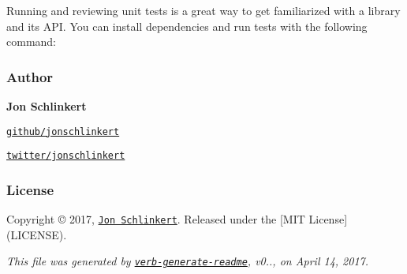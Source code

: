 Running and reviewing unit tests is a great way to get familiarized with a library and its A\+PI. You can install dependencies and run tests with the following command\+:




\subsubsection*{Author}

{\bfseries Jon Schlinkert}


\begin{DoxyItemize}
\item \href{https://github.com/jonschlinkert}{\tt github/jonschlinkert}
\item \href{https://twitter.com/jonschlinkert}{\tt twitter/jonschlinkert}
\end{DoxyItemize}

\subsubsection*{License}

Copyright © 2017, \href{https://github.com/jonschlinkert}{\tt Jon Schlinkert}. Released under the \mbox{[}M\+IT License\mbox{]}(L\+I\+C\+E\+N\+SE).





{\itshape This file was generated by \href{https://github.com/verbose/verb-generate-readme}{\tt verb-\/generate-\/readme}, v0.., on April 14, 2017.} 
